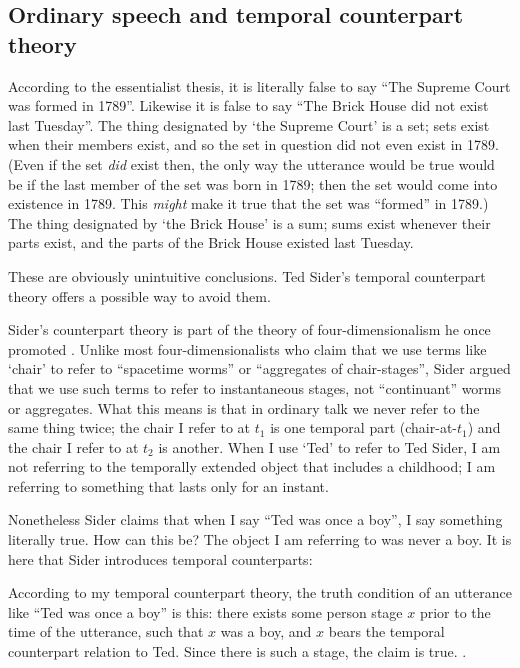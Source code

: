 \documentclass[12pt,twoside]{reedfancy}
\newenvironment{squote}{%
	\begin{spacing}{1}
	\begin{list}{}{%
	\setlength{\labelwidth}{0pt}%
	\rightmargin\leftmargin%
	}
	\item\relax
	}{%
	\end{list}%
	\end{spacing}
	}
\begin{document}
\begin{spacing}{1.25}
\subsection{Ordinary speech and temporal counterpart theory}
\label{counterpart}
According to the essentialist thesis, it is literally false to say
``The Supreme Court was formed in 1789''.  Likewise it is false to say
``The Brick House did not exist last Tuesday''.  The thing designated
by `the Supreme Court' is a set; sets exist when their members exist,
and so the set in question did not even exist in 1789.  (Even if the
set {\em did} exist then, the only way the utterance would be true
would be if the last member of the set was born in 1789; then the set
would come into existence in 1789.  This {\em might} make it true that
the set was ``formed'' in 1789.)  The thing designated by `the Brick
House' is a sum; sums exist whenever their parts exist, and the parts
of the Brick House existed last Tuesday.

These are obviously unintuitive conclusions.  Ted Sider's temporal
counterpart theory offers a possible way to avoid them.

Sider's counterpart theory is part of the theory of
four-dimensionalism he once promoted \citeyearpar{sider2001}.  Unlike
most four-dimensionalists who claim that we use terms like `chair' to
refer to ``spacetime worms'' or ``aggregates of chair-stages'', Sider
argued that we use such terms to refer to instantaneous stages, not
``continuant'' worms or aggregates.  What this means is that in
ordinary talk we never refer to the same thing twice; the chair I
refer to at $t_1$ is one temporal part (chair-at-$t_1$) and the chair
I refer to at $t_2$ is another.  When I use `Ted' to refer to Ted
Sider, I am not referring to the temporally extended object that
includes a childhood; I am referring to something that lasts only for
an instant.

Nonetheless Sider claims that when I say ``Ted was once a boy'', I say
something literally true.  How can this be?  The object I am referring
to was never a boy.  It is here that Sider introduces temporal
counterparts:

\begin{squote}
According to my temporal counterpart theory, the truth condition of an
utterance like ``Ted was once a boy'' is this: there exists some
person stage $x$ prior to the time of the utterance, such that $x$ was
a boy, and $x$ bears the temporal counterpart relation to Ted.  Since
there is such a stage, the claim is
true. \citeyearpar[193]{sider2001}.
\end{squote}


\end{spacing}
\end{document}
